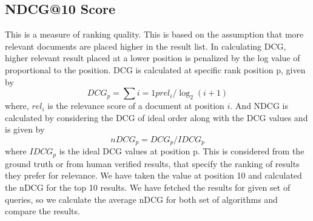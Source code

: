 \subsection{NDCG@10 Score}
This is a measure of ranking quality. This is based on the assumption that more relevant documents are placed higher in the result list. In calculating DCG, higher relevant result placed at a lower position is penalized by the log value of proportional to the position. DCG is calculated at specific rank position p, given by 
	\begin{equation}
	DCG_{p} = \sum{i=1}{p} rel_{i}/\log_{2}(i+1)
	\end{equation}
where, $rel_{i}$ is the relevance score of a document at position $i$. And NDCG is calculated by considering the DCG of ideal order along with the DCG values and is given by
\begin{equation}
    nDCG_{p} = DCG_{p}/IDCG_{p}
\end{equation}
where $IDCG_{p}$ is the ideal DCG values at position p. This is considered from the ground truth or from human verified results, that specify the ranking of results they prefer for relevance.
We have taken the value at position 10 and calculated the nDCG for the top 10 results. We have fetched the results for given set of queries, so we calculate the average nDCG for both set of algorithms and compare the results.